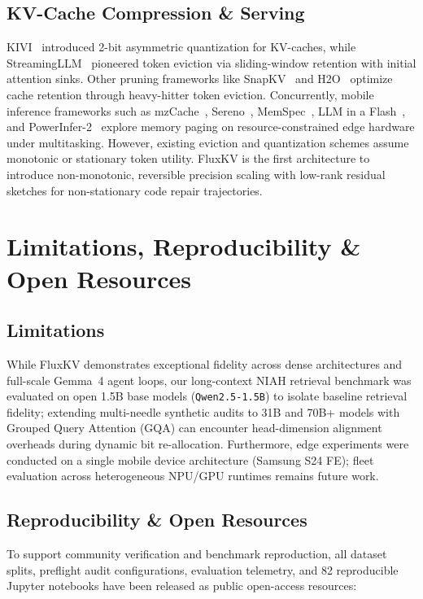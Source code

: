 \documentclass[10pt,twocolumn]{article}
\begin{document}
\subsection{KV-Cache Compression \& Serving}
KIVI~\cite{liu2024kivi} introduced 2-bit asymmetric quantization for KV-caches, while StreamingLLM~\cite{xiao2024streamingllm} pioneered token eviction via sliding-window retention with initial attention sinks. Other pruning frameworks like SnapKV~\cite{li2024snapkv} and H2O~\cite{zhang2024h2o} optimize cache retention through heavy-hitter token eviction. Concurrently, mobile inference frameworks such as mzCache~\cite{yu2026mzcache}, Sereno~\cite{xin2026sereno}, MemSpec~\cite{kim2026memspec}, LLM in a Flash~\cite{alizadeh2023llm}, and PowerInfer-2~\cite{xue2024powerinfer2} explore memory paging on resource-constrained edge hardware under multitasking. However, existing eviction and quantization schemes assume monotonic or stationary token utility. FluxKV is the first architecture to introduce non-monotonic, reversible precision scaling with low-rank residual sketches for non-stationary code repair trajectories.

\section{Limitations, Reproducibility \& Open Resources}

\subsection{Limitations}
While FluxKV demonstrates exceptional fidelity across dense architectures and full-scale Gemma~4 agent loops, our long-context NIAH retrieval benchmark was evaluated on open 1.5B base models (\texttt{Qwen2.5-1.5B}) to isolate baseline retrieval fidelity; extending multi-needle synthetic audits to 31B and 70B+ models with Grouped Query Attention (GQA) can encounter head-dimension alignment overheads during dynamic bit re-allocation. Furthermore, edge experiments were conducted on a single mobile device architecture (Samsung S24 FE); fleet evaluation across heterogeneous NPU/GPU runtimes remains future work.

\subsection{Reproducibility \& Open Resources}
\sloppy
To support community verification and benchmark reproduction, all dataset splits, preflight audit configurations, evaluation telemetry, and 82 reproducible Jupyter notebooks have been released as public open-access resources:
\end{document}
